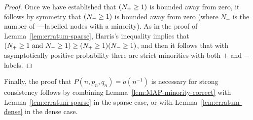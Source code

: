 \documentclass[EJP]{ejpecp}
\newcommand{\1}[1]{\mathbbm{1}_{\{#1\}}}
\let\Pr\relax
\DeclareMathOperator{\Pr}{Pr}
\begin{document}
\begin{proof}
    Once we have established that $\Pr(N_+ \ge 1)$ is bounded away from zero,
    it follows by symmetry that $\Pr(N_- \ge 1)$ is bounded away from zero (where $N_-$ is the number of $-$-labelled nodes with a minority). As in the proof of Lemma~\ref{lem:erratum-sparse}, Harris's inequality implies that $\Pr(N_+ \ge 1 \text{ and } N_- \ge 1) \ge \Pr(N_+ \ge 1) \Pr(N_- \ge 1)$, and then it follows that with asymptotically positive probability there are strict minorities with both $+$ and $-$ labels.
\end{proof}

Finally, the proof that $P(n, p_n, q_n) = o(n^{-1})$ is necessary for strong
consistency follows by combining Lemma~\ref{lem:MAP-minority-correct} with Lemma~\ref{lem:erratum-sparse}
in the sparse case, or with Lemma~\ref{lem:erratum-dense} in the dense case.



\end{document}
